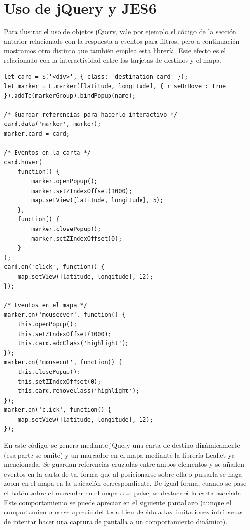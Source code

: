 \documentclass[11pt, a4paper]{book}
\begin{document}
	
	\section{Uso de jQuery y JES6}

    Para ilustrar el uso de objetos jQuery, vale por ejemplo el código de la sección anterior relacionado con la respuesta a eventos para filtros, pero a continuación mostramos otro distinto que también emplea esta librería. Este efecto es el relacionado con la interactividad entre las tarjetas de destinos y el mapa. 

    \begin{lstlisting}
let card = $('<div>', { class: 'destination-card' });
let marker = L.marker([latitude, longitude], { riseOnHover: true }).addTo(markerGroup).bindPopup(name);

/* Guardar referencias para hacerlo interactivo */
card.data('marker', marker);
marker.card = card;

/* Eventos en la carta */
card.hover(
    function() {
        marker.openPopup();
        marker.setZIndexOffset(1000);
        map.setView([latitude, longitude], 5);
    },
    function() {
        marker.closePopup();
        marker.setZIndexOffset(0);
    }
);
card.on('click', function() {
    map.setView([latitude, longitude], 12);
});

/* Eventos en el mapa */
marker.on('mouseover', function() {
    this.openPopup();
    this.setZIndexOffset(1000);
    this.card.addClass('highlight');
});
marker.on('mouseout', function() {
    this.closePopup();
    this.setZIndexOffset(0);
    this.card.removeClass('highlight');
});
marker.on('click', function() {
    map.setView([latitude, longitude], 12);
});
    \end{lstlisting}

    En este código, se genera mediante jQuery una carta de destino dinámicamente (esa parte se omite) y un marcador en el mapa mediante la librería Leaflet ya mencionada. Se guardan referencias cruzadas entre ambos elementos y se añaden eventos en la carta de tal forma que al posicionarse sobre ella o pulsarla se haga zoom en el mapa en la ubicación correspondiente. De igual forma, cuando se pase el botón sobre el marcador en el mapa o se pulse, se destacará la carta asociada. Este comportamiento se puede apreciar en el siguiente pantallazo (aunque el comportamiento no se aprecia del todo bien debido a las limitaciones intrínsecas de intentar hacer una captura de pantalla a un comportamiento dinámico).
\end{document}
